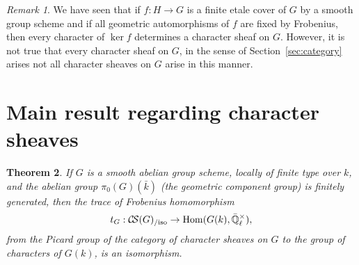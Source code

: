 \documentclass[11pt]{amsart}
\theoremstyle{plain}
\newtheorem{theorem}{Theorem}[section]
\theoremstyle{definition}
\theoremstyle{remark}
\newtheorem{remark}[theorem]{Remark}
\newcommand{\EE}{\mathbb{\bar Q}_\ell}
\newcommand{\bFq}{\bar{k}}
\newcommand{\Fq}{k}
\DeclareMathOperator{\Hom}{Hom}
\newcommand{\CS}{{\mathcal{C\hskip-1.8pt S}}}
\begin{document}
\begin{remark}
We have seen that if $f : H\to G$ is a finite etale cover of $G$ by a smooth group scheme and if all geometric automorphisms of $f$ are fixed by Frobenius, then every character of $\ker f$ determines a character sheaf on $G$. However, it is not true that every character sheaf on $G$, in the sense of Section~\ref{sec:category} arises not all character sheaves on $G$ arise in this manner. 
\end{remark}
%

\section{Main result regarding character sheaves}

%
\begin{theorem}\label{thm:snake}
If $G$ is a smooth abelian group scheme, locally of finite type over $\Fq$, and the abelian group $\pi_0(G)(\bFq)$ (the geometric component group) is finitely generated, then the trace of Frobenius homomorphism
\[
t_{G} : \CS(G)_{/\text{iso}} \to \Hom(G(\Fq),\EE^\times),
\]
from the Picard group of the category of character sheaves on $G$ to the group of characters of $G(\Fq)$, is an isomorphism. 
\end{theorem}
\end{document}
